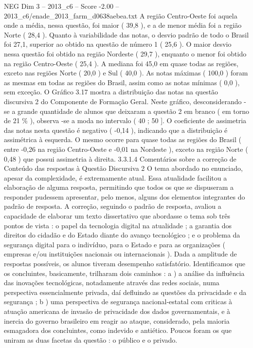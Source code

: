 \begin{textsample}{NEG Dim 3 – 2013\_c6 – Score -2.00 – 2013\_c6/enade\_2013\_farm\_d0638aebea.txt}
A região Centro-Oeste foi aquela onde a média, nessa questão, foi maior ( 39,8 ), e a de menor média foi a região Norte ( 28,4 ).
Quanto à variabilidade das notas, o desvio padrão de todo o Brasil foi 27,1, superior ao obtido na questão de número 1 ( 25,6 ).
O maior desvio nessa questão foi obtido na região Nordeste ( 29,7 ), enquanto o menor foi obtido na região Centro-Oeste ( 25,4 ).
A mediana foi 45,0 em quase todas as regiões, exceto nas regiões Norte ( 20,0 ) e Sul ( 40,0 ).
As notas máximas ( 100,0 ) foram as mesmas em todas as regiões do Brasil, assim como as notas mínimas ( 0,0 ), sem exceção.
O Gráfico 3.17 mostra a distribuição das notas na questão discursiva 2 do Componente de Formação Geral.
Neste gráfico, desconsiderando -se a grande quantidade de alunos que deixaram a questão 2 em branco ( em torno de 21 \% ), observa -se a moda no intervalo ( 40 ; 50 ].
O coeficiente de assimetria das notas nesta questão é negativo ( -0,14 ), indicando que a distribuição é assimétrica à esquerda.
O mesmo ocorre para quase todas as regiões do Brasil ( entre -0,26 na região Centro-Oeste e -0,01 na Nordeste ), exceto na região Norte ( 0,48 ) que possui assimetria à direita. 3.3.1.4 Comentários sobre a correção de Conteúdo das respostas à Questão Discursiva 2 O tema abordado no enunciado, apesar da complexidade, é extremamente atual.
Essa atualidade facilitou a elaboração de alguma resposta, permitindo que todos os que se dispuseram a responder pudessem apresentar, pelo menos, alguns dos elementos integrantes do padrão de resposta.
A correção, seguindo o padrão de resposta, avaliou a capacidade de elaborar um texto dissertativo que abordasse o tema sob três pontos de vista : o papel da tecnologia digital na atualidade ; a garantia dos direitos do cidadão e do Estado diante do avanço tecnológico ; e o problema da segurança digital para o indivíduo, para o Estado e para as organizações ( empresas e/ou instituições nacionais ou internacionais ).
Dada a amplitude de respostas possíveis, os alunos tiveram desempenho satisfatório.
Identificamos que os concluintes, basicamente, trilharam dois caminhos : a ) a análise da influência das inovações tecnológicas, notadamente através das redes sociais, numa perspectiva essencialmente privada, daí defluindo as questões da privacidade e da segurança ; b ) uma perspectiva de segurança nacional-estatal com criticas à atuação americana de invasão de privacidade dos dados governamentais, e à inercia do governo brasileiro em reagir ao ataque, considerado, pela maioria esmagadora dos concluintes, como indevido e antiético.
Poucos foram os que uniram as duas facetas da questão : o público e o privado.

\end{textsample}
